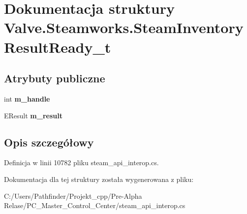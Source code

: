 \hypertarget{struct_valve_1_1_steamworks_1_1_steam_inventory_result_ready__t}{}\section{Dokumentacja struktury Valve.\+Steamworks.\+Steam\+Inventory\+Result\+Ready\+\_\+t}
\label{struct_valve_1_1_steamworks_1_1_steam_inventory_result_ready__t}
\subsection*{Atrybuty publiczne}
\begin{DoxyCompactItemize}
\item 
\mbox{\label{struct_valve_1_1_steamworks_1_1_steam_inventory_result_ready__t_a2218ceed0058b88f4c6ac38c75bd5307}} 
int {\bfseries m\+\_\+handle}
\item 
\mbox{\label{struct_valve_1_1_steamworks_1_1_steam_inventory_result_ready__t_a28c9beb9d27c0f5a0d0b95537d912d4b}} 
E\+Result {\bfseries m\+\_\+result}
\end{DoxyCompactItemize}


\subsection{Opis szczegółowy}


Definicja w linii 10782 pliku steam\+\_\+api\+\_\+interop.\+cs.



Dokumentacja dla tej struktury została wygenerowana z pliku\+:\begin{DoxyCompactItemize}
\item 
C\+:/\+Users/\+Pathfinder/\+Projekt\+\_\+cpp/\+Pre-\/\+Alpha Relase/\+P\+C\+\_\+\+Master\+\_\+\+Control\+\_\+\+Center/steam\+\_\+api\+\_\+interop.\+cs\end{DoxyCompactItemize}

